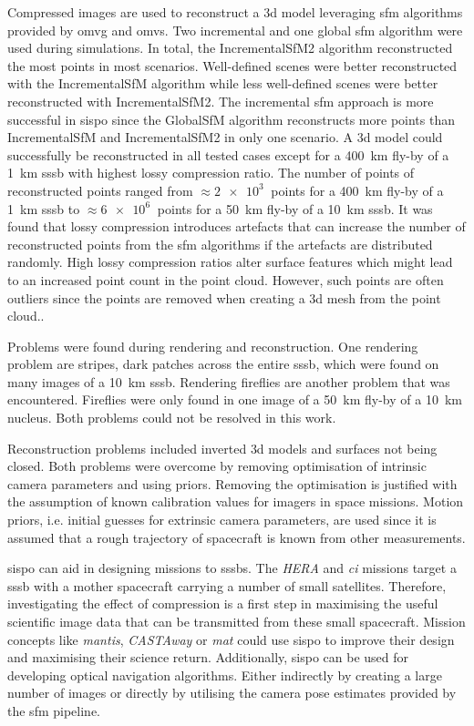 Compressed images are used to reconstruct a \gls{3d} model leveraging \gls{sfm} algorithms provided by \gls{omvg} and \gls{omvs}. Two incremental and one global \gls{sfm} algorithm were used during simulations. In total, the IncrementalSfM2 algorithm reconstructed the most points in most scenarios. Well-defined scenes were better reconstructed with the IncrementalSfM algorithm while less well-defined scenes were better reconstructed with IncrementalSfM2. The incremental \gls{sfm} approach is more successful in \gls{sispo} since the GlobalSfM algorithm reconstructs more points than IncrementalSfM and IncrementalSfM2 in only one scenario. A \gls{3d} model could successfully be reconstructed in all tested cases except for a \SI{400}{\kilo\meter} fly-by of a \SI{1}{\kilo\meter} \gls{sssb} with highest lossy compression ratio. The number of points of reconstructed points ranged from $\approx \SI{2e3}{}$ points for a \SI{400}{\kilo\meter} fly-by of a \SI{1}{\kilo\meter} \gls{sssb} to $\approx \SI{6e6}{}$ points for a \SI{50}{\kilo\meter} fly-by of a \SI{10}{\kilo\meter} \gls{sssb}. It was found that lossy compression introduces artefacts that can increase the number of reconstructed points from the \gls{sfm} algorithms if the artefacts are distributed randomly. High lossy compression ratios alter surface features which might lead to an increased point count in the point cloud. However, such points are often outliers since the points are removed when creating a \gls{3d} mesh from the point cloud..

Problems were found during rendering and reconstruction. One rendering problem are stripes, dark patches across the entire \gls{sssb}, which were found on many images of a \SI{10}{\kilo\meter} \gls{sssb}. Rendering fireflies are another problem that was encountered. Fireflies  were only found in one image of a \SI{50}{\kilo\meter} fly-by of a \SI{10}{\kilo\meter} nucleus. Both problems could not be resolved in this work.

Reconstruction problems included inverted \gls{3d} models and surfaces not being closed. Both problems were overcome by removing optimisation of intrinsic camera parameters and using priors. Removing the optimisation is justified with the assumption of known calibration values for imagers in space missions. Motion priors, i.e. initial guesses for extrinsic camera parameters, are used since it is assumed that a rough trajectory of spacecraft is known from other measurements.

\Gls{sispo} can aid in designing missions to \glspl{sssb}. The \textit{HERA} and \textit{\gls{ci}} missions target a \gls{sssb} with a mother spacecraft carrying a number of small satellites. Therefore, investigating the effect of compression is a first step in maximising the useful scientific image data that can be transmitted from these small spacecraft. Mission concepts like \textit{\gls{mantis}}, \textit{CASTAway} or \textit{\gls{mat}} could use \gls{sispo} to improve their design and maximising their science return. Additionally, \gls{sispo} can be used for developing optical navigation algorithms. Either indirectly by creating a large number of images or directly by utilising the camera pose estimates provided by the \gls{sfm} pipeline.

